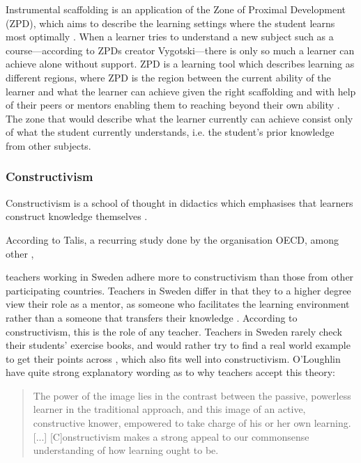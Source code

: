 Instrumental scaffolding is an application of the Zone of Proximal Development (\gls{ZPD}), which aims to describe the learning settings where the student learns most optimally \cite{vygotski_1978}. When a learner tries to understand a new subject such as a course---according to \gls{ZPD}s creator Vygotski---there is only so much a learner can achieve alone without support. \gls{ZPD} is a learning tool which describes learning as different regions, where \gls{ZPD} is the region between the current ability of the learner and what the learner can achieve given the right scaffolding and with help of their peers or mentors enabling them to reaching beyond their own ability \cite{vygotski_1978}. The zone that would describe what the learner currently can achieve consist only of what the student currently understands, i.e.
the student's prior knowledge from other subjects. 

\subsubsection{Constructivism}
Constructivism is a school of thought in didactics which emphasises that learners construct knowledge themselves \cite[s.~48]{imsen_2005}.  

\begin{modtext}
According to Talis, a recurring study done by the organisation OECD, among other \cite{talis_2014},\end{modtext} 
teachers working in Sweden adhere more to constructivism than those from other participating countries.  Teachers in Sweden differ in that they to a higher degree view their role as a mentor, as someone who facilitates the learning environment rather than a someone that transfers their knowledge \cite{talis_2014}. According to constructivism, this is the role of any teacher. Teachers in Sweden rarely check their students' exercise books, and would rather try to find a real world example to get their points across \cite{talis_2014}, which also fits well into constructivism. O'Loughlin have quite strong explanatory wording as to why teachers accept this theory: 

\blockquote{The power of the image lies in the contrast between the passive, powerless learner in the traditional approach, and this 
image of an active, constructive knower, empowered to take charge of his or her own learning. [...] [C]onstructivism makes a strong appeal to our commonsense understanding of how learning ought to be. \cite[p.~792]{oloughlin_2007}}.

